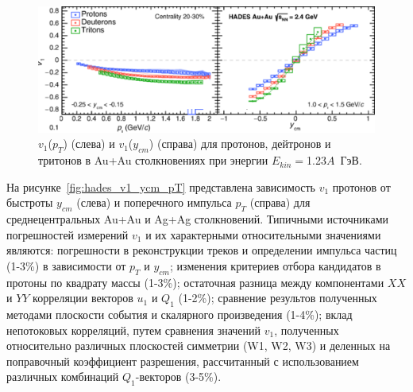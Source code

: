 \begin{figure}[h]
\begin{center}
\includegraphics[width=0.75\linewidth]{images/HADES_prl.png}
\caption{$v_1$($p_T$) (слева) и  $v_1$($y_{cm}$) (справа)  для протонов, дейтронов и тритонов  в  Au+Au столкновениях при
  энергии $E_{kin}=$1.23$A$~ГэВ.}
\label{fig:hades_prl}
\end{center}
\end{figure}

На рисунке~\ref{fig:hades_v1_ycm_pT} представлена зависимость  $v_1$ протонов от быстроты  $y_{cm}$  (слева) и поперечного импульса $p_T$ (справа) для среднецентральных Au+Au  и  Ag+Ag  столкновений. 
Типичными источниками погрешностей измерений $v_1$ и их характерными относительными значениями являются: 
погрешности в реконструкции треков и определении импульса частиц (1-3\%) в зависимости от $p_T$ и $y_{cm}$; 
из­менения критериев отбора кандидатов в протоны по квадрату массы (1-3\%); 
остаточная  разница между компонентами $XX$ и $YY$ корреляции векторов $u_1$ и $Q_1$ (1-2\%);
сравнение результов полученных методами плоскости события и скалярного произведения (1-4\%); 
вклад непотоковых корреляций, путем сравнения значений $v_1$, полученных относительно различных плоскостей симметрии (W1, W2, W3) и деленных на поправочный коэффициент разрешения, рассчитанный с использованием различных комбинаций $Q_1$-векторов (3-5\%).

